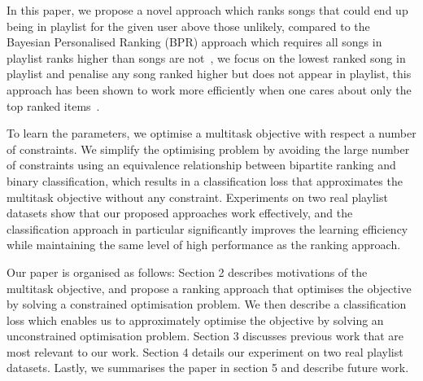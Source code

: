 In this paper, we propose a novel approach which ranks songs that could end up being in playlist for the 
given user above those unlikely, compared to the Bayesian Personalised Ranking (BPR) approach which requires all
songs in playlist ranks higher than songs are not~\cite{rendle2009bpr,mcfee2012million}, we focus on the lowest ranked
song in playlist and penalise any song ranked higher but does not appear in playlist,
this approach has been shown to work more efficiently when one cares about only the top ranked items~\cite{li2014top}.

To learn the parameters, we optimise a multitask objective with respect a number of constraints.
We simplify the optimising problem by avoiding the large number of constraints using an equivalence relationship 
between bipartite ranking and binary classification, which results in a classification loss that approximates the 
multitask objective without any constraint.
Experiments on two real playlist datasets show that our proposed approaches work effectively,
and the classification approach in particular significantly improves the learning efficiency 
while maintaining the same level of high performance as the ranking approach.

Our paper is organised as follows:
Section 2 describes motivations of the multitask objective, and propose a ranking approach 
that optimises the objective by solving a constrained optimisation problem.
We then describe a classification loss which enables us to approximately optimise the objective by
solving an unconstrained optimisation problem.
Section 3 discusses previous work that are most relevant to our work.
Section 4 details our experiment on two real playlist datasets.
Lastly, we summarises the paper in section 5 and describe future work.

